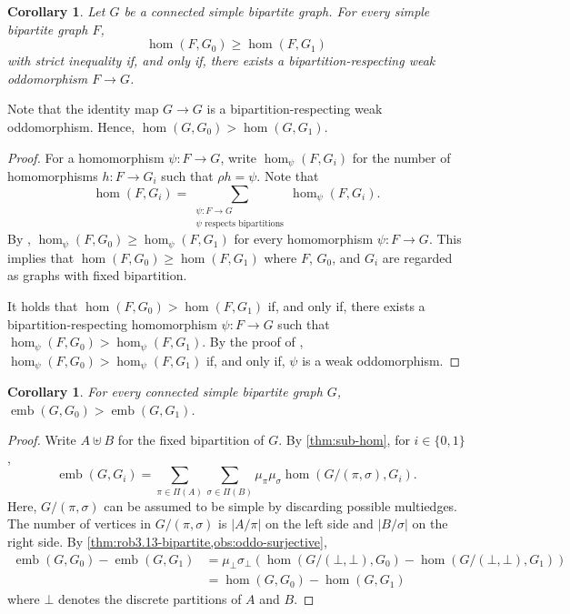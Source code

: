 \documentclass[11pt, DIV=15]{scrarticle}
\theoremstyle{definition}
\theoremstyle{plain}
\newtheorem{corollary}[definition]{Corollary}
\theoremstyle{remark}
\DeclareMathOperator{\emb}{emb}
\begin{document}
	\begin{corollary}\label{thm:rob3.13-bipartite}
		Let $G$ be a connected simple bipartite graph.
		For every simple bipartite graph $F$,
		\[
		\hom(F, G_0) \geq \hom(F, G_1)
		\]
		with strict inequality if, and only if, there exists a bipartition-respecting weak oddomorphism $F \to G$.
	\end{corollary}
	Note that the identity map $G \to G$ is a bipartition-respecting weak oddomorphism. Hence, $\hom(G, G_0) > \hom(G, G_1)$.
	\begin{proof}
		For a homomorphism $\psi \colon F\to G$, write $\hom_\psi(F, G_i)$ for the number of homomorphisms $h \colon F \to G_i$ such that $\rho h = \psi$.
		Note that
		\[
			\hom(F, G_i) = \sum_{\substack{\psi \colon F \to G \\ \psi \text{ respects bipartitions}}} \hom_\psi(F, G_i). 
		\]
		By \cite[Theorem~3.6]{roberson_oddomorphisms_2022},
		$\hom_\psi(F, G_0) \geq \hom_\psi(F, G_1)$ for every homomorphism $\psi \colon F \to G$.
		This implies that $\hom(F, G_0) \geq \hom(F, G_1)$ where $F$, $G_0$, and $G_i$ are regarded as graphs with fixed bipartition.
		
		It holds that $\hom(F, G_0) > \hom(F, G_1)$ if, and only if, there exists a bipartition-respecting homomorphism $\psi \colon F\to G$ such that $\hom_\psi(F, G_0) > \hom_\psi(F, G_1)$.
		By the proof of \cite[Theorem~3.13]{roberson_oddomorphisms_2022}, $\hom_\psi(F, G_0) > \hom_\psi(F, G_1)$ if, and only if, $\psi$ is a weak oddomorphism.
	\end{proof}

	\begin{corollary}\label{cor:sub-cfi}
		For every connected simple bipartite graph $G$,
		$\emb(G, G_0) > \emb(G, G_1)$.
	\end{corollary}
	\begin{proof}
		Write $A \uplus B$ for the fixed bipartition of $G$.
		By \cref{thm:sub-hom}, for $i \in \{0,1\}$,
		\[
		\emb(G, G_i) = \sum_{\pi \in \Pi(A)} \sum_{\sigma \in \Pi(B)} \mu_\pi \mu_\sigma \hom(G/(\pi, \sigma), G_i).
		\]
		Here, $G/(\pi, \sigma)$ can be assumed to be simple by discarding possible multiedges.
		The number of vertices in $G/(\pi, \sigma)$ is $|A/\pi|$ on the left side and $|B/\sigma|$ on the right side.
		By \cref{thm:rob3.13-bipartite,obs:oddo-surjective},
		\begin{align*}
			\emb(G, G_0) - \emb(G, G_1) 
			&= \mu_\bot \sigma_\bot \left( \hom(G/(\bot, \bot), G_0) - \hom(G/(\bot, \bot), G_1) \right) \\
			&= \hom(G, G_0) - \hom(G, G_1)
		\end{align*}
		where $\bot$ denotes the discrete partitions of $A$ and $B$.
	\end{proof}
\end{document}
